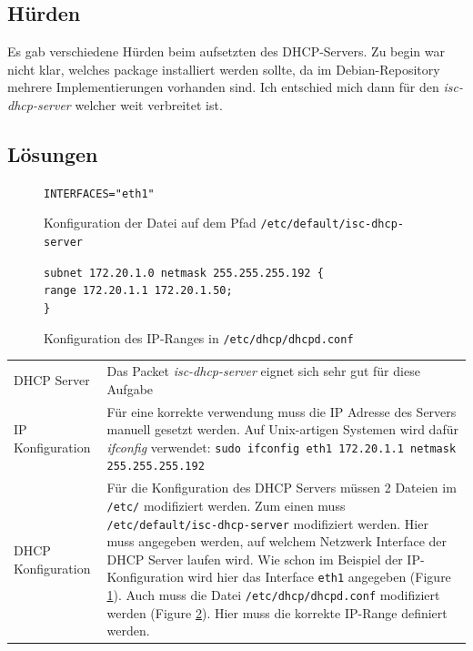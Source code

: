 \documentclass[12pt,a4paper,twoside,titlepage]{article}
\begin{document}
        \subsection{Hürden}

        Es gab verschiedene Hürden beim aufsetzten des DHCP-Servers. Zu begin war nicht klar, welches package installiert werden sollte, da im Debian-Repository mehrere Implementierungen vorhanden sind. Ich entschied mich dann für den \textit{isc-dhcp-server} welcher weit verbreitet ist.
        
        \subsection{Lösungen}
        
        \begin{figure}
        	\texttt{INTERFACES="eth1"}
        	\caption{\label{iscdhcpserver} Konfiguration der Datei auf dem Pfad \texttt{/etc/default/isc-dhcp-server}}
        \end{figure}
        
        \begin{figure}
        	\texttt{subnet 172.20.1.0 netmask 255.255.255.192 \{\\\space range 172.20.1.1 172.20.1.50;\\\}}\\
        	\caption{\label{dhcpdconf} Konfiguration des IP-Ranges in \texttt{/etc/dhcp/dhcpd.conf}}
        \end{figure}

        \begin{tabular}{lp{10cm}}
            DHCP Server & Das Packet \textit{isc-dhcp-server} eignet sich sehr gut für diese Aufgabe \\
            IP Konfiguration & Für eine korrekte verwendung muss die IP Adresse des Servers manuell gesetzt werden. Auf Unix-artigen Systemen wird dafür \textit{ifconfig} verwendet: \texttt{sudo ifconfig eth1 172.20.1.1 netmask 255.255.255.192}\\
            DHCP Konfiguration & Für die Konfiguration des DHCP Servers müssen 2 Dateien im \texttt{/etc/} modifiziert werden. Zum einen muss \texttt{/etc/default/isc-dhcp-server} modifiziert werden. Hier muss angegeben werden, auf welchem Netzwerk Interface der DHCP Server laufen wird. Wie schon im Beispiel der IP-Konfiguration wird hier das Interface \texttt{eth1} angegeben (Figure \ref{iscdhcpserver}). Auch muss die Datei \texttt{/etc/dhcp/dhcpd.conf} modifiziert werden (Figure \ref{dhcpdconf}). Hier muss die korrekte IP-Range definiert werden.
        \end{tabular}
        
\end{document}
